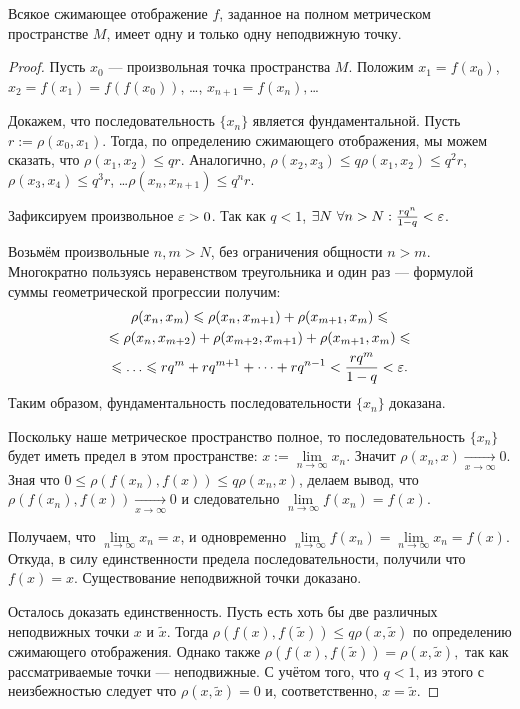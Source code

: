 \begin{Theorem}
  Всякое сжимающее отображение $f$, заданное на полном метрическом пространстве $M$, имеет одну и только одну неподвижную точку.
\end{Theorem}
\begin{proof}

Пусть $x_0$ --- произвольная точка пространства $M$. Положим $x_1 = f(x_0) $, $x_2 = f(x_1) = f(f(x_0))$, \dots, $x_{n+1} = f(x_{n}),$\dots

Докажем, что последовательность  $\{ x_n \} $ является фундаментальной.
Пусть $r := \rho(x_0, x_1)$.  Тогда, по определению сжимающего отображения, мы можем сказать, что  $\rho(x_1, x_2) \leq qr$. Аналогично, $\rho(x_2, x_3) \leq q \rho(x_1, x_2) \leq q^2r $, $\rho(x_3, x_4) \leq q^3r $, \dots  $\rho(x_{n}, x_{n+1}) \leq q^nr$.

Зафиксируем произвольное $\varepsilon>0$. 
Так как  $q < 1 $, $\exists N\ \forall n>N: \frac{rq^n}{1-q} < \varepsilon$.

Возьмём произвольные $n, m >N$, без ограничения общности $n>m$.
Многократно пользуясь неравенством треугольника и один раз --- формулой суммы геометрической прогрессии получим:
\begin{multline}\rho(x_n, x_m) \leq \rho(x_n, x_{m+1})+\rho(x_{m+1}, x_m)\leq\\ \leq \rho(x_n, x_{m+2})+ \rho(x_{m+2}, x_{m+1})+\rho(x_{m+1}, x_m) \leq\\\leq \dots\leq rq^{m} + rq^{m+1}+\dots+rq^{n-1} < \frac{rq^m}{1-q} < \eps .\end{multline}	
Таким образом, фундаментальность последовательности  $\{ x_n \} $ доказана. 


Поскольку наше метрическое пространство полное, то последовательность $\{ x_n \}$ будет иметь предел в этом пространстве: $x:= \lim\limits_{n \to \infty}x_n$.
Значит $\rho(x_{n}, x) \xrightarrow[x \to\infty]{} 0$. Зная что $0\leq\rho(f(x_{n}), f(x))\leq q \rho(x_{n}, x)$, делаем вывод, что $\rho(f(x_{n}), f(x)) \xrightarrow[x \to\infty]{} 0$ и следовательно $\lim\limits_{n \to \infty}f(x_n) = f(x)$.

Получаем, что  $\lim\limits_{n \to \infty}x_n = x$, и одновременно $\lim\limits_{n \to \infty}f(x_n) = \lim\limits_{n \to \infty}x_n= f(x)$. Откуда, в силу единственности предела последовательности, получили что $f(x) = x$.
Существование неподвижной точки доказано.


Осталось доказать единственность. 
Пусть есть хоть бы две различных неподвижных точки $x$ и $\tilde{x}$.
Тогда $\rho(f(x), f(\tilde{x})) \leq q\rho(x, \tilde{x})$ по определению сжимающего отображения. Однако также $\rho(f(x), f(\tilde{x})) = \rho(x, \tilde{x}),$ так как рассматриваемые точки --- неподвижные. С учётом того, что $q<1$, из этого с неизбежностью следует что $\rho(x, \tilde{x}) = 0$ и, соответственно, $x = \tilde{x}$.

\end{proof}

